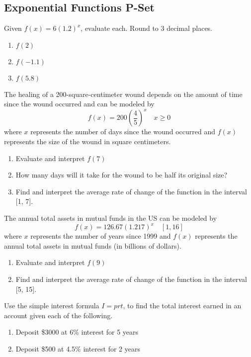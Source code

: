 \documentclass{article}
\newcounter{pset}
\begin{document}
\subsection*{Exponential Functions P-Set} 

Given $f(x) = 6(1.2)^x$, evaluate each. Round to 3 decimal places.
\begin{multicols}{3}
\begin{enumerate}
    \item $f(2)$
    \item $f(-1.1)$
    \item $f(5.8)$
\end{enumerate}     \setcounter{pset}{\value{enumi}}
\end{multicols}

The healing of a 200-square-centimeter wound depends on the amount of time since the wound occurred and can be modeled by
\[
f(x) = 200\left(\frac{4}{5}\right)^x \quad x \geq 0
\]
where $x$ represents the number of days since the wound occurred and $f(x)$ represents the size of the wound in square centimeters.
\begin{enumerate}   \setcounter{enumi}{\value{pset}}
    \item Evaluate and interpret $f(7)$
    \item How many days will it take for the wound to be half its original size?
    \item Find and interpret the average rate of change of the function in the interval [1, 7].
\end{enumerate} \setcounter{pset}{\value{enumi}}

The annual total assets in mutual funds in the US can be modeled by 
\[
f(x) = 126.67(1.217)^x  \quad [1, 16]
\]
where $x$ represents the number of years since 1999 and $f(x)$ represents the annual total assets in mutual funds  (in billions of dollars).
\begin{enumerate}   \setcounter{enumi}{\value{pset}}
    \item Evaluate and interpret $f(9)$
    \item Find and interpret the average rate of change of the function in the interval [5, 15].
\end{enumerate} \setcounter{pset}{\value{enumi}}

Use the simple interest formula $I = prt$, to find the total interest earned in an account given each of the following.
\begin{multicols}{2}
\begin{enumerate}   \setcounter{enumi}{\value{pset}}
    \item Deposit \$3000 at 6\% interest for 5 years
    \item Deposit \$500 at 4.5\% interest for 2 years
\end{enumerate} \setcounter{pset}{\value{enumi}}
\end{multicols}
\end{document}
